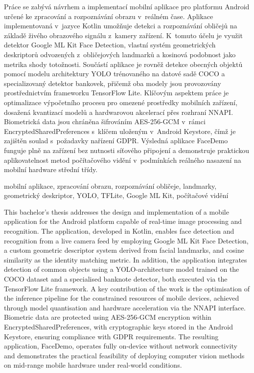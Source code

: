 \documentclass[FM,BP,CZ]{tulthesis}
\begin{document}


\begin{abstractCZ}
Práce se zabývá návrhem a implementací mobilní aplikace pro platformu Android určené ke zpracování a rozpoznávání obrazu v~reálném čase. Aplikace implementovaná v~jazyce Kotlin umožňuje detekci a rozpoznávání obličejů na základě živého obrazového signálu z~kamery zařízení. K~tomuto účelu je využit detektor Google ML Kit Face Detection, vlastní systém geometrických deskriptorů odvozených z~obličejových landmarků a kosinová podobnost jako metrika shody totožnosti. Součástí aplikace je rovněž detekce obecných objektů pomocí modelu architektury YOLO trénovaného na datové sadě COCO a specializovaný detektor bankovek, přičemž oba modely jsou provozovány prostřednictvím frameworku TensorFlow Lite. Klíčovým aspektem práce je optimalizace výpočetního procesu pro omezené prostředky mobilních zařízení, dosažená kvantizací modelů a hardwarovou akcelerací přes rozhraní NNAPI. Biometrická data jsou chráněna šifrováním AES-256-GCM v~rámci EncryptedSharedPreferences s~klíčem uloženým v~Android Keystore, čímž je zajištěn soulad s~požadavky nařízení GDPR. Výsledná aplikace FaceDemo funguje plně na zařízení bez nutnosti síťového připojení a demonstruje praktickou aplikovatelnost metod počítačového vidění v~podmínkách reálného nasazení na mobilní hardware střední třídy.
\end{abstractCZ}

\begin{keywordsCZ}
mobilní aplikace, zpracování obrazu, rozpoznávání obličeje, landmarky, geometrický deskriptor, YOLO, TFLite, Google ML Kit, počítačové vidění
\end{keywordsCZ}

\vspace{2cm}

\begin{abstractEN}
This bachelor’s thesis addresses the design and implementation of a mobile application for the Android platform capable of real-time image processing and recognition. The application, developed in Kotlin, enables face detection and recognition from a live camera feed by employing Google ML Kit Face Detection, a custom geometric descriptor system derived from facial landmarks, and cosine similarity as the identity matching metric. In addition, the application integrates detection of common objects using a YOLO-architecture model trained on the COCO dataset and a specialised banknote detector, both executed via the TensorFlow Lite framework. A key contribution of the work is the optimisation of the inference pipeline for the constrained resources of mobile devices, achieved through model quantisation and hardware acceleration via the NNAPI interface. Biometric data are protected using AES-256-GCM encryption within EncryptedSharedPreferences, with cryptographic keys stored in the Android Keystore, ensuring compliance with GDPR requirements. The resulting application, FaceDemo, operates fully on-device without network connectivity and demonstrates the practical feasibility of deploying computer vision methods on mid-range mobile hardware under real-world conditions.
\end{abstractEN}
\end{document}
